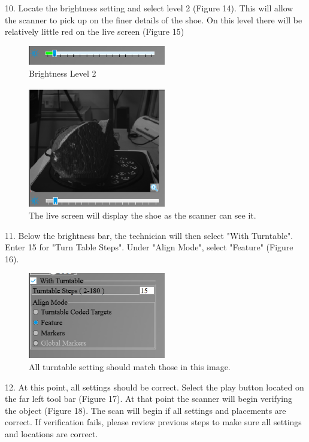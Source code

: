 10. Locate the brightness setting and select level 2 (Figure 14). This will allow the scanner to pick up on the finer details of the shoe. On this level there will be relatively little red on the live screen (Figure 15)

\begin{figure}[!htp]
\centering
\includegraphics[width=6cm]{Brightness_Bar}
\caption{Brightness Level 2}
\label{Image 14}
\end{figure}

\begin{figure}[!htp]
\centering
\includegraphics[width=6cm]{Live}
\caption{The live screen will display the shoe as the scanner can see it.}
\label{Image 15}
\end{figure}

\newpage

11. Below the brightness bar, the technician will then select "With Turntable". Enter 15 for "Turn Table Steps". Under "Align Mode", select "Feature" (Figure 16).

\begin{figure}[!htp]
\centering
\includegraphics[width=6cm]{Turn_Table_Mode}
\caption{All turntable setting should match those in this image.}
\label{Image 16}
\end{figure}

12. At this point, all settings should be correct. Select the play button located on the far left tool bar (Figure 17). At that point the scanner will begin verifying the object (Figure 18). The scan will begin if all settings and placements are correct. If verification fails, please review previous steps to make sure all settings and locations are correct.


